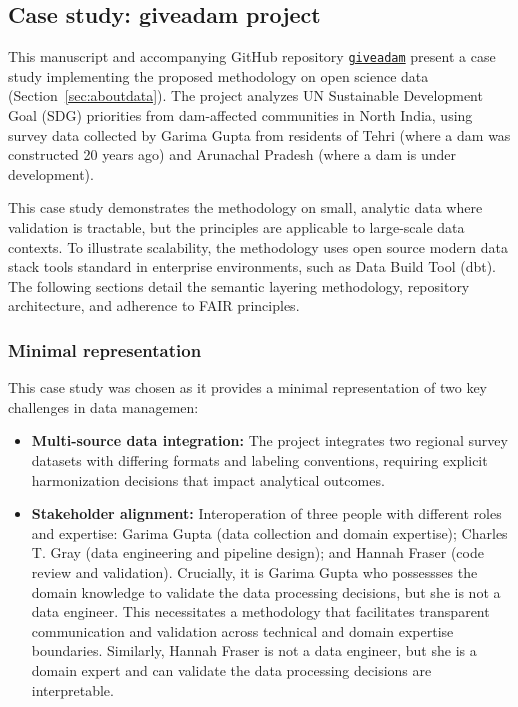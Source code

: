 \documentclass{article}
\begin{document}
\subsection{Case study: giveadam project}

This manuscript and accompanying GitHub repository \href{https://github.com/softloud/giveadam}{\texttt{giveadam}} present a case study implementing the proposed methodology on open science data (Section~\ref{sec:aboutdata}). The project analyzes UN Sustainable Development Goal (SDG) priorities from dam-affected communities in North India, using survey data collected by Garima Gupta from residents of Tehri (where a dam was constructed 20 years ago) and Arunachal Pradesh (where a dam is under development).

This case study demonstrates the methodology on small, analytic data where validation is tractable, but the principles are applicable to large-scale data contexts. To illustrate scalability, the methodology uses open source modern data stack tools standard in enterprise environments, such as Data Build Tool (dbt). The following sections detail the semantic layering methodology, repository architecture, and adherence to FAIR principles.

\subsubsection{Minimal representation}

This case study was chosen as it provides a minimal representation of two key challenges in data managemen:

\begin{itemize}
  \item \textbf{Multi-source data integration:} The project integrates two regional survey datasets with differing formats and labeling conventions, requiring explicit harmonization decisions that impact analytical outcomes. 
  \item \textbf{Stakeholder alignment:} Interoperation of three people with different roles and expertise: Garima Gupta (data collection and domain expertise); Charles T. Gray (data engineering and pipeline design); and Hannah Fraser (code review and validation). Crucially, it is Garima Gupta who possessses the domain knowledge to validate the data processing decisions, but she is not a data engineer. This necessitates a methodology that facilitates transparent communication and validation across technical and domain expertise boundaries. Similarly, Hannah Fraser is not a data engineer, but she is a domain expert and can validate the data processing decisions are interpretable.
\end{itemize}
\end{document}
